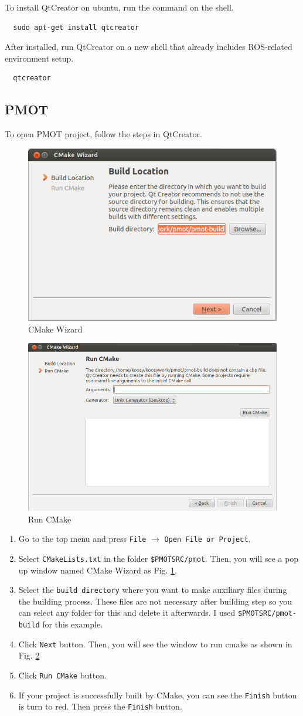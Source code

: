 \documentclass[a4paper,twoside, openright,12pt]{report}
\begin{document}
To install QtCreator on ubuntu, run the command on the shell. 
\begin{verbatim}
  sudo apt-get install qtcreator
\end{verbatim}
 
After installed, run QtCreator on a new shell that already includes ROS-related environment setup. 
\begin{verbatim}
  qtcreator
\end{verbatim}

\subsection{PMOT}
To open PMOT project, follow the steps in QtCreator. 
\begin{figure}[t]
	\centering
	\includegraphics[width=0.5\linewidth]{fig/cmakewizard.png}
	\caption{CMake Wizard}
	\label{fig:cmakewizard}
\end{figure}

\begin{figure}[t]
	\centering
	\includegraphics[width=0.5\linewidth]{fig/runcmake.png}
	\caption{Run CMake}
	\label{fig:runcmake}
\end{figure}
\begin{enumerate}
	\item Go to the top menu and press \verb|File| $\rightarrow$ \verb|Open File or Project|.
	\item Select \verb|CMakeLists.txt| in the folder \verb|$PMOTSRC/pmot|. Then, you will see a pop up window named CMake Wizard as Fig. \ref{fig:cmakewizard}.
	\item Select the \verb|build directory| where you want to make auxiliary files during the building process. These files are not necessary after building step so you can select any folder for this and delete it afterwards. 
	I used \verb|$PMOTSRC/pmot-build| for this example. 
	\item Click \verb|Next| button. Then, you will see the window to run cmake as shown in Fig. \ref{fig:runcmake}
	\item Click \verb|Run CMake| button.
	\item If your project is successfully built by CMake, you can see the \verb|Finish| button is turn to red. Then press the \verb|Finish| button. 
\end{enumerate}
\end{document}
